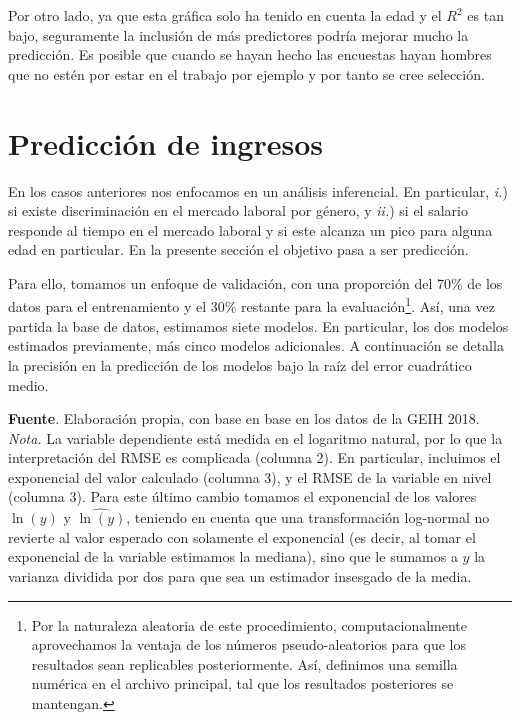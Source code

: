 Por otro lado, ya que esta gráfica solo ha tenido en cuenta la edad y el $R^2$ es tan bajo, seguramente la inclusión de más predictores podría mejorar mucho la predicción. Es posible que cuando se hayan hecho las encuestas hayan hombres que no estén por estar en el trabajo por ejemplo y por tanto se cree selección. 

\section{Predicción de ingresos}  \label{Sec:forecast}
En los casos anteriores nos enfocamos en un análisis inferencial. En particular, \textit{i.}) si existe discriminación en el mercado laboral por género, y \textit{ii.}) si el salario responde al tiempo en el mercado laboral y si este alcanza un pico para alguna edad en particular. En la presente sección el objetivo pasa a ser predicción.

Para ello, tomamos un enfoque de validación, con una proporción del 70\% de los datos para el entrenamiento y el 30\% restante para la evaluación\footnote{Por la naturaleza aleatoria de este procedimiento, computacionalmente aprovechamos la ventaja de los números pseudo-aleatorios para que los resultados sean replicables posteriormente. Así, definimos una semilla numérica en el archivo principal, tal que los resultados posteriores se mantengan.}. Así, una vez partida la base de datos, estimamos siete modelos. En particular, los dos modelos estimados previamente, más cinco modelos adicionales. A continuación se detalla la precisión en la predicción de los modelos bajo la raíz del error cuadrático medio.


\begin{center}
    \textbf{Fuente}. Elaboración propia, con base en base en los datos de la GEIH 2018. \\
    \scriptsize{\textit{Nota.} La variable dependiente está medida en el logaritmo natural, por lo que la interpretación del RMSE es complicada (columna 2). En particular, incluimos el exponencial del valor calculado (columna 3), y el RMSE de la variable en nivel (columna 3). Para este último cambio tomamos el exponencial de los valores $\ln (y)$ y $\hat{\ln (y)}$, teniendo en cuenta que una transformación log-normal no revierte al valor esperado con solamente el exponencial (es decir, al tomar el exponencial de la variable estimamos la mediana), sino que le sumamos a $y$ la varianza dividida por dos para que sea un estimador insesgado de la media.}
\end{center}

